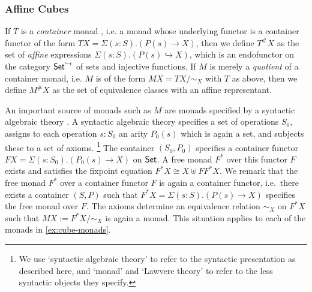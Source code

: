 \documentclass[a4paper]{memoir}
\begin{document}
\subsubsection{Affine Cubes}
If $T$ is a \emph{container} monad \cite{container-combinatorics}, i.e. a monad whose underlying functor is a container functor \cite{containers} of the form $TX = \Sigma(s : S).(P(s) \to X)$, then we define $T^\# X$ as the set of \emph{affine} expressions $\Sigma(s : S).(P(s) \hookrightarrow X)$, which is an endofunctor on the category ${\mathsf{Set}}^{\hookrightarrow}$ of sets and injective functions.
If $M$ is merely a \emph{quotient} of a container monad, i.e. $M$ is of the form $MX = TX/\sim_X$ with $T$ as above, then we define $M^\# X$ as the set of equivalence classes with an affine representant.

\begin{remark}
An important source of monads such as $M$ are monads specified by a syntactic algebraic theory \cite{manes-book,adamek-book,keml-diagrams}.
A syntactic algebraic theory specifies a set of operations $S_0$, assigns to each operation $s : S_0$ an arity $P_0(s)$ which is again a set, and subjects these to a set of axioms.%
\footnote{We use `syntactic algebraic theory' to refer to the syntactic presentation as described here, and `monad' and `Lawvere theory' to refer to the less syntactic objects they specify.
%
}
The container $(S_0, P_0)$ specifies a container functor $FX = \Sigma(s : S_0).(P_0(s) \to X)$ on ${\mathsf{Set}}$.
A free monad $F^*$ over this functor $F$ exists and satisfies the fixpoint equation $F^* X \cong X \uplus F F^* X$.
We remark that the free monad $F^*$ over a container functor $F$ is again a container functor, i.e.\ there exists a container $(S, P)$ such that
$F^* X = \Sigma(s : S).(P(s) \to X)$
specifies the free monad over $F$.
The axioms determine an equivalence relation $\sim_X$ on $F^* X$ such that $M X := F^* X/\sim_X$ is again a monad.
This situation applies to each of the monads in \cref{ex:cube-monads}.


\end{remark}
\end{document}
